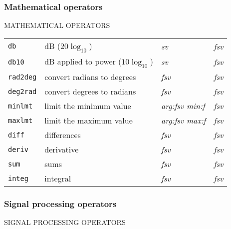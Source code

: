 \subsubsection{Mathematical operators}{MATHEMATICAL OPERATORS}

\begin{tabular}{p{.8in}p{2.5in}p{1.0in}p{.75in}}
{\tt db} & dB ($20 \log_{10}$) & {\it sv} & {\it fsv} \\
{\tt db10} & dB applied to power ($10 \log_{10}$) & {\it sv} 
	& {\it fsv} \\
{\tt rad2deg} & convert radians to degrees & {\it fsv} & {\it fsv} \\
{\tt deg2rad} & convert degrees to radians & {\it fsv} & {\it fsv} \\
{\tt minlmt} & limit the minimum value & {\it arg:fsv \newline min:f}
	& {\it fsv} \\
{\tt maxlmt} & limit the maximum value & {\it arg:fsv \newline max:f} 
	& {\it fsv} \\
{\tt diff} & differences & {\it fsv} & {\it fsv} \\
{\tt deriv} & derivative & {\it fsv} & {\it fsv} \\
{\tt sum} & sums & {\it fsv} & {\it fsv} \\
{\tt integ} & integral & {\it fsv} & {\it fsv}
\end{tabular}

\subsubsection{Signal processing operators}{SIGNAL PROCESSING OPERATORS}

